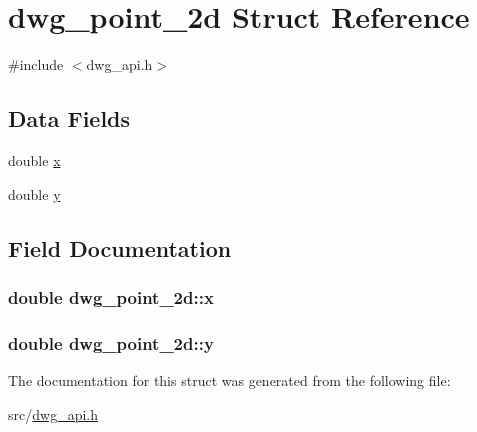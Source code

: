 \hypertarget{structdwg__point__2d}{\section{dwg\-\_\-point\-\_\-2d \-Struct \-Reference}
\label{structdwg__point__2d}
}


{\ttfamily \#include $<$dwg\-\_\-api.\-h$>$}

\subsection*{\-Data \-Fields}
\begin{DoxyCompactItemize}
\item 
double \hyperlink{structdwg__point__2d_a0aa18b628b5203f862b709f5783ba320}{x}
\item 
double \hyperlink{structdwg__point__2d_a96606bba08458d041acbb3d42752ac26}{y}
\end{DoxyCompactItemize}


\subsection{\-Field \-Documentation}
\hypertarget{structdwg__point__2d_a0aa18b628b5203f862b709f5783ba320}{
\subsubsection[{x}]{\setlength{\rightskip}{0pt plus 5cm}double {\bf dwg\-\_\-point\-\_\-2d\-::x}}}\label{structdwg__point__2d_a0aa18b628b5203f862b709f5783ba320}
\hypertarget{structdwg__point__2d_a96606bba08458d041acbb3d42752ac26}{
\subsubsection[{y}]{\setlength{\rightskip}{0pt plus 5cm}double {\bf dwg\-\_\-point\-\_\-2d\-::y}}}\label{structdwg__point__2d_a96606bba08458d041acbb3d42752ac26}


\-The documentation for this struct was generated from the following file\-:\begin{DoxyCompactItemize}
\item 
src/\hyperlink{dwg__api_8h}{dwg\-\_\-api.\-h}\end{DoxyCompactItemize}
